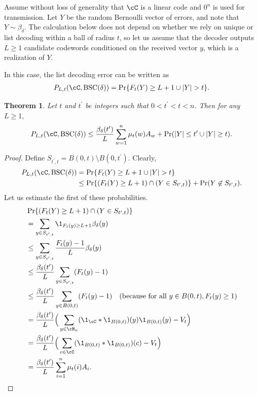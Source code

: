 \documentclass{amsart}
\newtheorem{theorem}{Theorem}[section]
\theoremstyle{remark}
\begin{document}
Assume without loss of generality that $\cC$ is a linear code and $0^n$ is used for transmission.
Let $Y$ be the random Bernoulli vector of errors, and note that $Y \sim \beta_{\delta}$.
The calculation below does not depend on whether we rely on unique or list decoding within a ball of radius $t$, so let us assume that the decoder outputs $L\ge 1$  candidate codewords conditioned on the received vector $y$, which is a realization of $Y.$ 

In this case, the list decoding error can be written as 
\begin{align}\label{eq: lst_error def}
    P_{L,t}(\cC,{\text{\rm BSC}}(\delta)) = \Pr\{F_t(Y) \geq L+1 \cup |Y| > t\}.
\end{align}

\begin{theorem}\label{lemma: list decoding error} 
Let $t$ and $t^{\prime}$ be integers such that $0<t^{\prime} < t<n$. Then for any $L\ge 1,$
\begin{align} \label{eq: ld_error}
    P_{L,t}(\cC,{\text{\rm BSC}}(\delta)) \leq \frac{\beta_{\delta}(t^{\prime})}{L}\sum_{w=1}^{n}{\mu_t(w)}A_w + \Pr(|Y|\leq t^\prime \cup |Y|\geq t ).
\end{align}
\end{theorem}

\begin{proof}
     Define $S_{t^{\prime},t}= B(0,t)\setminus B(0,t^{\prime})$. Clearly,
\begin{align*}
    P_{L,t}(\cC,{\text{\rm BSC}}(\delta)) &= \Pr\{F_t(Y) \geq L+1 \cup |Y| > t\}\\
 & \le \Pr\{(F_t(Y) \geq L+1) \cap (Y\in S_{t^{\prime},t})\} + \Pr(Y\not\in S_{t^{\prime},t}).
   \end{align*}
 Let us estimate the first of these probabilities. 
  \begin{align*}
   & \Pr\{(F_t(Y) \geq L+1) \cap (Y\in S_{t^{\prime},t})\}\\ 
   & = \sum_{y\in S_{t^{\prime},t}}\1_{F_t(y)\geq L+1}\beta_{\delta}(y)\\  
   & \leq \sum_{y\in S_{t^{\prime},t}}\frac{F_t(y)-1}{L}\beta_{\delta}(y)
   \\
    & \leq \frac{\beta_{\delta}(t^{\prime})}{L}\sum_{y\in S_{t^{\prime},t}}(F_t(y)-1)    \\
    & \leq \frac{\beta_{\delta}(t^{\prime})}{L}\sum_{y\in B(0,t)}(F_t(y)-1) \quad \text{(because for all  } y \in B(0,t),  F_t(y) \geq 1)  \\ 
    & = \frac{\beta_{\delta}(t^{\prime})}{L}\Big(\sum_{y \in \cH _n}(\1_{\cC}\ast\1_{B(0,t)})(y)\1_{B(0,t)}(y) -V_t\Big)\\
    & = \frac{\beta_{\delta}(t^{\prime})}{L}\Big(\sum_{c \in \cC}(\1_{B(0,t)}\ast\1_{B(0,t)})(c) -V_t\Big)\\
    & = \frac{\beta_{\delta}(t^{\prime})}{L}\sum_{i =1}^n\mu_t(i)A_i. \qedhere
\end{align*}
\end{proof}
\end{document}
